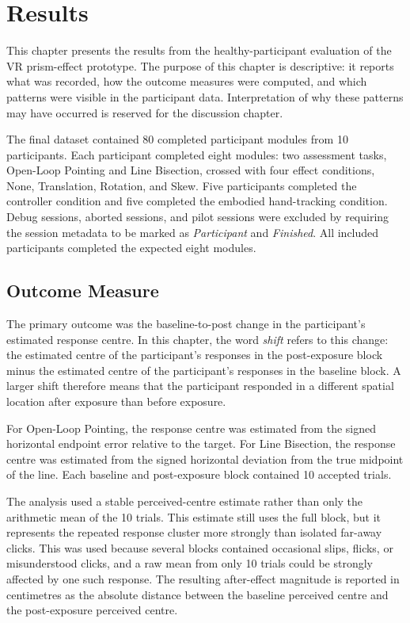 \chapter{Results}
\label{chap:results}

This chapter presents the results from the healthy-participant evaluation of the VR prism-effect prototype. The purpose of this chapter is descriptive: it reports what was recorded, how the outcome measures were computed, and which patterns were visible in the participant data. Interpretation of why these patterns may have occurred is reserved for the discussion chapter.

The final dataset contained 80 completed participant modules from 10 participants. Each participant completed eight modules: two assessment tasks, Open-Loop Pointing and Line Bisection, crossed with four effect conditions, None, Translation, Rotation, and Skew. Five participants completed the controller condition and five completed the embodied hand-tracking condition. Debug sessions, aborted sessions, and pilot sessions were excluded by requiring the session metadata to be marked as \emph{Participant} and \emph{Finished}. All included participants completed the expected eight modules.

\section{Outcome Measure}
\label{sec:results-outcome-measure}

The primary outcome was the baseline-to-post change in the participant's estimated response centre. In this chapter, the word \emph{shift} refers to this change: the estimated centre of the participant's responses in the post-exposure block minus the estimated centre of the participant's responses in the baseline block. A larger shift therefore means that the participant responded in a different spatial location after exposure than before exposure.

For Open-Loop Pointing, the response centre was estimated from the signed horizontal endpoint error relative to the target. For Line Bisection, the response centre was estimated from the signed horizontal deviation from the true midpoint of the line. Each baseline and post-exposure block contained 10 accepted trials.

The analysis used a stable perceived-centre estimate rather than only the arithmetic mean of the 10 trials. This estimate still uses the full block, but it represents the repeated response cluster more strongly than isolated far-away clicks. This was used because several blocks contained occasional slips, flicks, or misunderstood clicks, and a raw mean from only 10 trials could be strongly affected by one such response. The resulting after-effect magnitude is reported in centimetres as the absolute distance between the baseline perceived centre and the post-exposure perceived centre.

